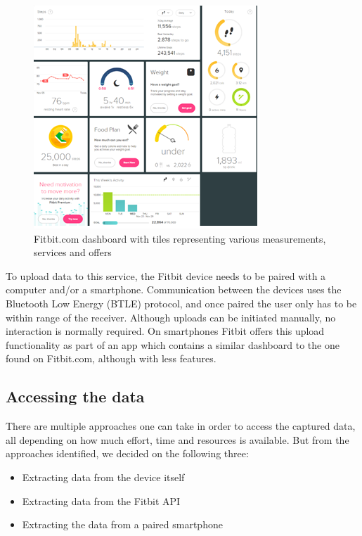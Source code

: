 \documentclass[a4paper,11pt,dvips]{article}
\begin{document}
\begin{figure}
\begin{center}
\includegraphics[natwidth=321bp,natheight=317bp,width=0.6\linewidth]{dash}
\end{center}
\caption{Fitbit.com dashboard with tiles representing various measurements, services and offers}
\label{fig:dash}
\end{figure}

To upload data to this service, the Fitbit device needs to be paired with a computer and/or a smartphone. Communication between the devices uses the Bluetooth Low Energy (BTLE) protocol, and once paired the user only has to be within range of the receiver. Although uploads can be initiated manually, no interaction is normally required. On smartphones Fitbit offers this upload functionality as part of an app which contains a similar dashboard to the one found on Fitbit.com, although with less features.

\subsection{Accessing the data}
There are multiple approaches one can take in order to access the captured data, all depending on how much effort, time and resources is available. But from the approaches identified, we decided on the following three:

\begin{itemize}
\item Extracting data from the device itself
\item Extracting data from the Fitbit API
\item Extracting the data from a paired smartphone
\end{itemize}
\end{document}
